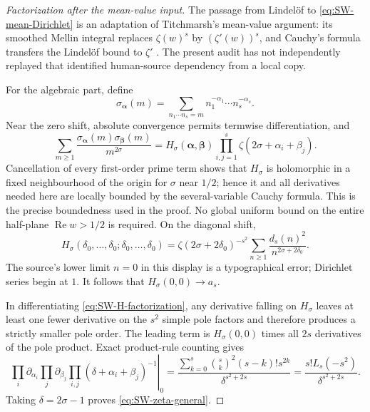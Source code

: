\begin{proof}[Factorization after the mean-value input]
The passage from Lindel\"of to \eqref{eq:SW-mean-Dirichlet} is an adaptation of Titchmarsh's
mean-value argument: its smoothed Mellin integral replaces $\zeta(w)^s$ by
$(\zeta'(w))^s$, and Cauchy's formula transfers the Lindel\"of bound to $\zeta'$
\cite[Chs.~7 and~13]{titchmarsh1986}.  The present audit has not independently replayed that
identified human-source dependency from a local copy.

For the algebraic part, define
\begin{equation}
 \sigma_{\boldsymbol\alpha}(m)=
 \sum_{n_1\cdots n_s=m}n_1^{-\alpha_1}\cdots n_s^{-\alpha_s}.
\end{equation}
Near the zero shift, absolute convergence permits termwise differentiation, and
\begin{equation}
 \sum_{m\geq1}\frac{\sigma_{\boldsymbol\alpha}(m)
                            \sigma_{\boldsymbol\beta}(m)}{m^{2\sigma}}
 =H_\sigma(\boldsymbol\alpha,\boldsymbol\beta)
  \prod_{i,j=1}^{s}\zeta(2\sigma+\alpha_i+\beta_j).
 \label{eq:SW-H-factorization}
\end{equation}
Cancellation of every first-order prime term shows that $H_\sigma$ is holomorphic in a
fixed neighbourhood of the origin for $\sigma$ near $1/2$; hence it and all derivatives
needed here are locally bounded by the several-variable Cauchy formula.  This is the precise
boundedness used in the proof.  No global uniform bound on the entire half-plane
$\operatorname{Re}w>1/2$ is required.  On the diagonal shift,
\begin{equation}
 H_\sigma(\delta_0,\ldots,\delta_0;\delta_0,\ldots,\delta_0)
 =\zeta(2\sigma+2\delta_0)^{-s^2}
   \sum_{n\geq1}\frac{d_s(n)^2}{n^{2\sigma+2\delta_0}}.
 \label{eq:SW-H-diagonal}
\end{equation}
The source's lower limit $n=0$ in this display is a typographical error; Dirichlet series
begin at $1$.  It follows that $H_\sigma(0,0)\to a_s$.

In differentiating \eqref{eq:SW-H-factorization}, any derivative falling on $H_\sigma$
leaves at least one fewer derivative on the $s^2$ simple pole factors and therefore produces
a strictly smaller pole order.  The leading term is $H_\sigma(0,0)$ times all $2s$
derivatives of the pole product.  Exact product-rule counting gives
\begin{equation}
 \left.\prod_i\partial_{\alpha_i}\prod_j\partial_{\beta_j}
 \prod_{i,j}(\delta+\alpha_i+\beta_j)^{-1}\right|_0
 =\frac{\sum_{k=0}^{s}\binom{s}{k}^2(s-k)!s^{2k}}
 {\delta^{s^2+2s}}
 =\frac{s!L_s(-s^2)}{\delta^{s^2+2s}}.
 \label{eq:SW-pole-product-general}
\end{equation}
Taking $\delta=2\sigma-1$ proves \eqref{eq:SW-zeta-general}.
\end{proof}

